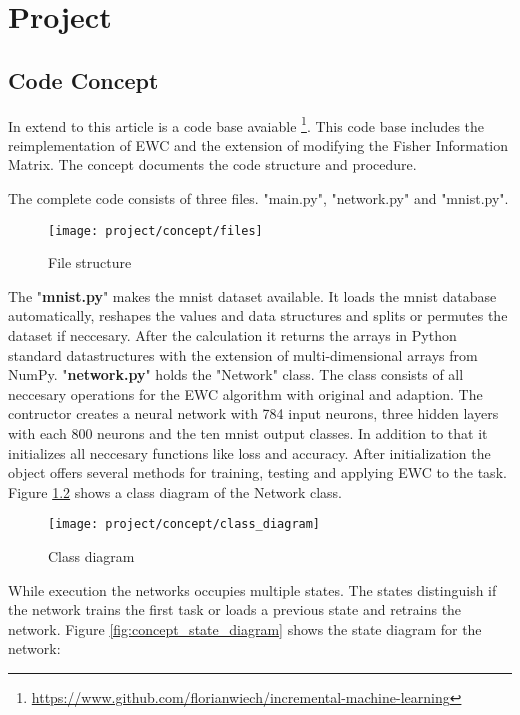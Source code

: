 \chapter{Project}

\section{Code Concept}

In extend to this article is a code base avaiable \footnote{\url{https://www.github.com/florianwiech/incremental-machine-learning}}.
This code base includes the reimplementation of EWC and the extension of modifying the Fisher Information Matrix.
The concept documents the code structure and procedure.

The complete code consists of three files.
"main.py", "network.py" and "mnist.py".

\begin{figure}[H]
    \centering
    \texttt{[image: project/concept/files]}
    \caption{File structure}
    \label{fig:concept_file_structure}
\end{figure}

The "\textbf{mnist.py}" makes the mnist dataset available.
It loads the mnist database automatically, reshapes the values and data structures and splits or permutes the dataset if neccesary.
After the calculation it returns the arrays in Python standard datastructures with the extension of multi-dimensional arrays from NumPy.
\newline
"\textbf{network.py}" holds the "Network" class.
The class consists of all neccesary operations for the EWC algorithm with original and adaption.
The contructor creates a neural network with 784 input neurons, three hidden layers with each 800 neurons and the ten mnist output classes.
In addition to that it initializes all neccesary functions like loss and accuracy.
After initialization the object offers several methods for training, testing and applying EWC to the task.
Figure \ref{fig:concept_class_diagram} shows a class diagram of the Network class.

\begin{figure}[H]
    \centering
    \texttt{[image: project/concept/class\_diagram]}
    \caption{Class diagram}
    \label{fig:concept_class_diagram}
\end{figure}

While execution the networks occupies multiple states.
The states distinguish if the network trains the first task or loads a previous state and retrains the network.
Figure \ref{fig:concept_state_diagram} shows the state diagram for the network:

